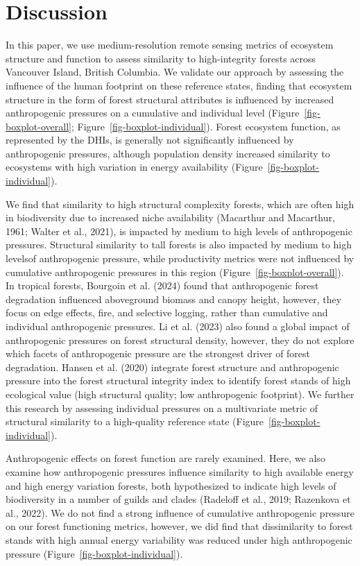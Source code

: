 \documentclass[
]{agujournal2019}
\begin{document}
\section{Discussion}\label{discussion}

In this paper, we use medium-resolution remote sensing metrics of
ecosystem structure and function to assess similarity to high-integrity
forests across Vancouver Island, British Columbia. We validate our
approach by assessing the influence of the human footprint on these
reference states, finding that ecosystem structure in the form of forest
structural attributes is influenced by increased anthropogenic pressures
on a cumulative and individual level (Figure~\ref{fig-boxplot-overall};
Figure~\ref{fig-boxplot-individual}). Forest ecosystem function, as
represented by the DHIs, is generally not significantly influenced by
anthropogenic pressures, although population density increased
similarity to ecosystems with high variation in energy availability
(Figure~\ref{fig-boxplot-individual}).

We find that similarity to high structural complexity forests, which are
often high in biodiversity due to increased niche availability
(Macarthur and Macarthur, 1961; Walter et al., 2021), is impacted by
medium to high levels of anthropogenic pressures. Structural similarity
to tall forests is also impacted by medium to high levelsof
anthropogenic pressure, while productivity metrics were not influenced
by cumulative anthropogenic pressures in this region
(Figure~\ref{fig-boxplot-overall}). In tropical forests, Bourgoin et al.
(2024) found that anthropogenic forest degradation influenced
aboveground biomass and canopy height, however, they focus on edge
effects, fire, and selective logging, rather than cumulative and
individual anthropogenic pressures. Li et al. (2023) also found a global
impact of anthropogenic pressures on forest structural density, however,
they do not explore which facets of anthropogenic pressure are the
strongest driver of forest degradation. Hansen et al. (2020) integrate
forest structure and anthropogenic pressure into the forest structural
integrity index to identify forest stands of high ecological value (high
structural quality; low anthropogenic footprint). We further this
research by assessing individual pressures on a multivariate metric of
structural similarity to a high-quality reference state
(Figure~\ref{fig-boxplot-individual}).

Anthropogenic effects on forest function are rarely examined. Here, we
also examine how anthropogenic pressures influence similarity to high
available energy and high energy variation forests, both hypothesized to
indicate high levels of biodiversity in a number of guilds and clades
(Radeloff et al., 2019; Razenkova et al., 2022). We do not find a strong
influence of cumulative anthropogenic pressure on our forest functioning
metrics, however, we did find that dissimilarity to forest stands with
high annual energy variability was reduced under high anthropogenic
pressure (Figure~\ref{fig-boxplot-individual}).
\end{document}
